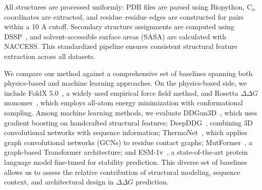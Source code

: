 \documentclass[11pt]{article}
\begin{document}
All structures are processed uniformly: PDB files are parsed using Biopython,
C$_\alpha$ coordinates are extracted, and residue–residue edges are constructed
for pairs within a 10 A cutoff. Secondary structure assignments are computed
using DSSP~\cite{kabsch1983dssp}, and solvent-accessible surface areas (SASA)
are calculated with NACCESS. This standardized pipeline ensures consistent
structural feature extraction across all datasets.




We compare our method against a comprehensive set of baselines spanning both
physics-based and machine learning approaches. On the physics-based side, we
include FoldX 5.0~\cite{schymkowitz2005foldx}, a widely used empirical force
field method, and Rosetta $\Delta \Delta G$ monomer~\cite{kellogg2011role}, which employs
all-atom energy minimization with conformational sampling. Among machine
learning methods, we evaluate DDGun3D~\cite{montanucci2022ddgun}, which uses
gradient boosting on handcrafted structural features;
DeepDDG~\cite{cao2019deepddg}, combining 3D convolutional networks with
sequence information; ThermoNet~\cite{li2020predicting}, which applies graph
convolutional networks (GCNs) to residue contact graphs;
MutFormer~\cite{zhou2020mutation}, a graph-based Transformer architecture; and
ESM-1v~\cite{meier2021language}, a state-of-the-art protein language model
fine-tuned for stability prediction. This diverse set of baselines allows us to
assess the relative contribution of structural modeling, sequence context, and
architectural design in $\Delta \Delta G$ prediction.











\end{document}
